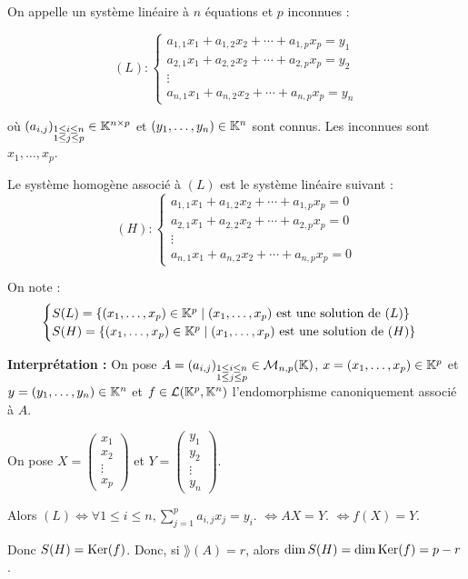 \documentclass[12pt, a4paper]{report}
\begin{document}
\begin{definition}
    On appelle un système linéaire à $n$ équations et $p$ inconnues :

    $$(L) : \begin{cases}
        a_{1,1} x_1 + a_{1,2} x_2 + \cdots + a_{1,p} x_p = y_1 \\
        a_{2,1} x_1 + a_{2,2} x_2 + \cdots + a_{2,p} x_p = y_2 \\
        \vdots \\
        a_{n,1} x_1 + a_{n,2} x_2 + \cdots + a_{n,p} x_p = y_n
    \end{cases}$$

    où $(a_{i,j})_{\substack{1 \le i \le n \\ 1 \le j \le p}} \in \mathbb{K}^{n \times p}$ et $(y_1,\dots,y_n) \in \mathbb{K}^n$ sont connus. Les inconnues sont $x_1,\dots,x_p$.

    Le système homogène associé à $(L)$ est le système linéaire suivant :
    $$(H) : \begin{cases}
        a_{1,1} x_1 + a_{1,2} x_2 + \cdots + a_{1,p} x_p = 0 \\
        a_{2,1} x_1 + a_{2,2} x_2 + \cdots + a_{2,p} x_p = 0 \\
        \vdots \\
        a_{n,1} x_1 + a_{n,2} x_2 + \cdots + a_{n,p} x_p = 0
    \end{cases}$$

    On note :
    $$\begin{cases}
        S(L) = \{(x_1,\dots,x_p) \in \mathbb{K}^p \mid (x_1,\dots,x_p) \text{ est une solution de } (L)\} \\
        S(H) = \{(x_1,\dots,x_p) \in \mathbb{K}^p \mid (x_1,\dots,x_p) \text{ est une solution de } (H)\}
    \end{cases}$$

    \textbf{Interprétation :} On pose $A = (a_{i,j})_{\substack{1 \le i \le n \\ 1 \le j \le p}} \in \mathcal M_{n,p}(\mathbb{K})$, $x = (x_1,\dots,x_p) \in \mathbb{K}^p$ et $y = (y_1,\dots,y_n) \in \mathbb{K}^n$ et $f \in \mathcal L(\mathbb{K}^p,\mathbb{K}^n)$ l'endomorphisme canoniquement associé à $A$.

    On pose $X = \begin{pmatrix}
        x_1 \\
        x_2 \\
        \vdots \\
        x_p
    \end{pmatrix}$ et $Y = \begin{pmatrix}
        y_1 \\
        y_2 \\
        \vdots \\
        y_n
    \end{pmatrix}$.

    Alors $(L) \iff \forall 1 \le i \le n, \sum_{j=1}^p a_{i,j}x_j = y_i$.
    $\iff AX = Y$.
    $\iff f(X) = Y$.

    Donc $S(H) = \mathrm{Ker}(f)$.
    Donc, si $\rang(A) = r$, alors $\dim S(H) = \dim \mathrm{Ker}(f) = p - r$.
\end{definition}
\end{document}
